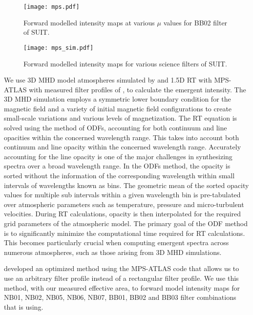 \begin{figure}
    \centering
    \texttt{[image: mps.pdf]}
    \caption{Forward modelled intensity maps at various $\mu$ values for BB02 filter of SUIT.}
    \label{fig:flux_maps}
\end{figure}

\begin{figure}
    \centering
    \texttt{[image: mps\_sim.pdf]}
    \caption{Forward modelled intensity maps for various science filters of SUIT.}
    \label{fig:flux_maps_filt}
\end{figure}

We use 3D MHD model atmospheres simulated by \cite{rempel20} and 1.5D RT with MPS-ATLAS \citep[see e.g.,][for details]{anusha21} with measured filter profiles of {\suit}, to calculate the emergent intensity. The 3D MHD simulation employs a symmetric lower boundary condition for the magnetic field and a variety of initial magnetic field configurations to create small-scale variations and various levels of magnetization. The RT equation is solved using the method of ODFs, accounting for both continuum and line opacities within the concerned wavelength range. This takes into account both continuum and line opacity within the concerned wavelength range. Accurately accounting for the line opacity is one of the major challenges in synthesizing spectra over a broad wavelength range. In the ODFs method, the opacity is sorted without the information of the corresponding wavelength within small intervals of wavelengths known as bins. The geometric mean of the sorted opacity values for multiple sub intervals within a given wavelength bin is pre-tabulated over atmospheric parameters such as temperature, pressure and micro-turbulent velocities. During RT calculations, opacity is then interpolated for the required grid parameters of the atmospheric model. The primary goal of the ODF method is to significantly minimize the computational time required for RT calculations. This becomes particularly crucial when computing emergent spectra across numerous atmospheres, such as those arising from 3D MHD simulations. 

\cite{anusha21} developed an optimized method using the MPS-ATLAS code that allows us to use an arbitrary filter profile instead of a rectangular filter profile. We use this method, with our measured effective area, to forward model intensity maps for NB01, NB02, NB05, NB06, NB07, BB01, BB02 and BB03 filter combinations that {\suit} is using.

